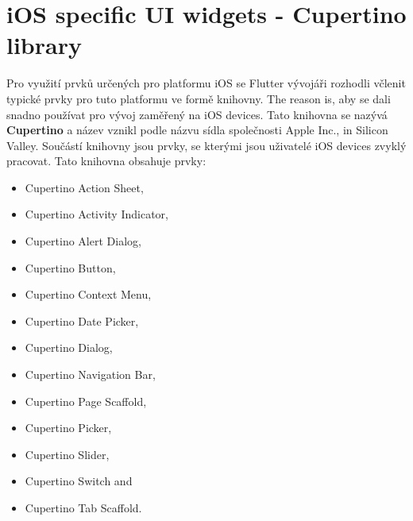 



\section{iOS specific UI widgets - Cupertino library}\label{sec:ios-specific-ui-widgets}
Pro využití prvků určených pro platformu iOS se Flutter vývojáři rozhodli včlenit typické prvky pro tuto platformu ve formě knihovny.
The reason is, aby se dali snadno používat pro vývoj zaměřený na iOS devices.
Tato knihovna se nazývá \textbf{Cupertino} a název vznikl podle názvu sídla společnosti Apple Inc., in Silicon Valley.
Součástí knihovny jsou prvky, se kterými jsou uživatelé iOS devices zvyklý pracovat.
Tato knihovna obsahuje prvky:
\begin{itemize}
    \item Cupertino Action Sheet,
    \item Cupertino Activity Indicator,
    \item Cupertino Alert Dialog,
    \item Cupertino Button,
    \item Cupertino Context Menu,
    \item Cupertino Date Picker,
    \item Cupertino Dialog,
    \item Cupertino Navigation Bar,
    \item Cupertino Page Scaffold,
    \item Cupertino Picker,
    \item Cupertino Slider,
    \item Cupertino Switch and
    \item Cupertino Tab Scaffold.\cite{cupertino}
\end{itemize}


